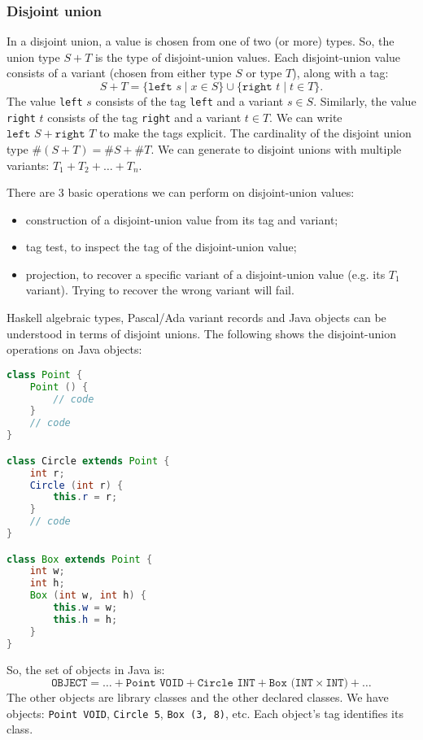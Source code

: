 \documentclass[a4paper, openany]{memoir}
\begin{document}
\subsubsection{Disjoint union}
In a disjoint union, a value is chosen from one of two (or more) types. So, the union type $S + T$ is the type of disjoint-union values. Each disjoint-union value consists of a variant (chosen from either type $S$ or type $T$), along with a tag:
\[S + T = \{\texttt{left } s \mid x \in S\} \cup \{\texttt{right } t \mid t \in T\}.\]
The value \texttt{left} $s$ consists of the tag \texttt{left} and a variant $s \in S$. Similarly, the value \texttt{right} $t$ consists of the tag \texttt{right} and a variant $t \in T$. We can write $\texttt{left } S + \texttt{right } T$ to make the tags explicit. The cardinality of the disjoint union type $\#(S + T) = \#S + \#T$. We can generate to disjoint unions with multiple variants: $T_1 + T_2 + \dots + T_n$.

There are 3 basic operations we can perform on disjoint-union values:
\begin{itemize}
    \item construction of a disjoint-union value from its tag and variant;
    \item tag test, to inspect the tag of the disjoint-union value;
    \item projection, to recover a specific variant of a disjoint-union value (e.g. its $T_1$ variant). Trying to recover the wrong variant will fail.
\end{itemize}

Haskell algebraic types, Pascal/Ada variant records and Java objects can be understood in terms of disjoint unions. The following shows the disjoint-union operations on Java objects:
\begin{lstlisting}[language=java]
class Point {
    Point () {
        // code
    }
    // code
}

class Circle extends Point {
    int r;
    Circle (int r) {
        this.r = r;
    }
    // code
}

class Box extends Point {
    int w;
    int h;
    Box (int w, int h) {
        this.w = w;
        this.h = h;
    }
}
\end{lstlisting}
So, the set of objects in Java is:
\[\texttt{OBJECT} = \dots + \texttt{Point VOID} + \texttt{Circle INT} + \texttt{Box (INT} \times \texttt{INT)} + \dots\]
The other objects are library classes and the other declared classes. We have objects: \texttt{Point VOID}, \texttt{Circle 5}, \texttt{Box (3, 8)}, etc. Each object's tag identifies its class.
\end{document}
